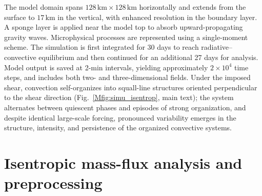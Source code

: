 \documentclass[
    aps,
    prl,
    reprint,
    superscriptaddress,
    amsmath,amssymb,
    nofootinbib,
    floatfix
]{revtex4-2}
\begin{document}
The model domain spans $128\,\mathrm{km} \times 128\,\mathrm{km}$ horizontally and extends from the surface to $17\,\mathrm{km}$ in the vertical, with enhanced resolution in the boundary layer. A sponge layer is applied near the model top to absorb upward-propagating gravity waves. Microphysical processes are represented using a single-moment scheme. The simulation is first integrated for 30 days to reach radiative--convective equilibrium and then continued for an additional 27 days for analysis. Model output is saved at 2-min intervals, yielding approximately $2\times10^{4}$ time steps, and includes both two- and three-dimensional fields. Under the imposed shear, convection self-organizes into squall-line structures oriented perpendicular to the shear direction (Fig.~\ref{Mfig:simu_isentrop}, main text); the system alternates between quiescent phases and episodes of strong organization, and despite identical large-scale forcing, pronounced variability emerges in the structure, intensity, and persistence of the organized convective systems.

\section{Isentropic mass-flux analysis and preprocessing}
\end{document}
